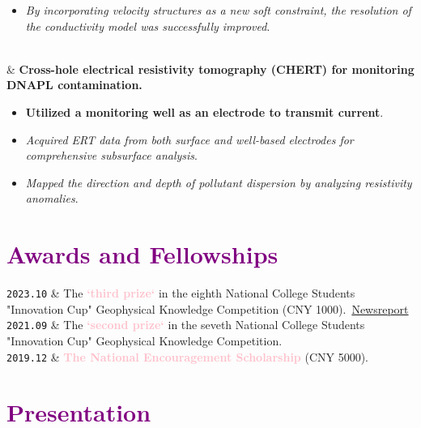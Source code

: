 \documentclass[10pt,a4paper]{article}
\newcommand{\OColon}[1]{\fontsize{10pt}{0}\selectfont \texttt{#1}}
\newcommand{\FixedRightSpace}[1]{\hfill\makebox[7em][l]{#1}}
\begin{document}
\begin{EntriesTableDurationBack}
\begin{itemize}[label={-}, leftmargin=*]
    \item \textit{By incorporating velocity structures as a new soft constraint, the resolution of the conductivity model was successfully improved}.
  \end{itemize}
  \\
  &
  \textbf{Cross-hole electrical resistivity tomography (CHERT) for monitoring DNAPL contamination.}\FixedRightSpace{2022.07 - 2022.11}
  \begin{itemize}[label={-}, leftmargin=*] 
    \item \textbf{Utilized a monitoring well as an electrode to transmit current}.
    \item \textit{Acquired ERT data from both surface and well-based electrodes for comprehensive subsurface analysis}.
    \item \textit{Mapped the direction and depth of pollutant dispersion by analyzing resistivity anomalies}.
  \end{itemize}
\end{EntriesTableDurationBack}

\section{\textcolor{purple}{Awards and Fellowships}}

\begin{EntriesDate}
  \OColon{2023.10} &
  The \textbf{\textcolor{pink}{ `third prize`}} in the eighth National College Students "Innovation Cup" Geophysical Knowledge Competition (CNY 1000).\
  \href{https://newshub.sustech.edu.cn/html/202306/43985.html}{Newsreport}
  \\
  \OColon{2021.09} &
  The \textbf{\textcolor{pink}{ `second prize`}} in the seveth National College Students "Innovation Cup" Geophysical Knowledge Competition.
  \\
  \OColon{2019.12} &
  \textbf{\textcolor{pink}{The National Encouragement Scholarship}} (CNY 5000).
  \\
\end{EntriesDate}

\section{\textcolor{purple}{Presentation}}
\end{document}
